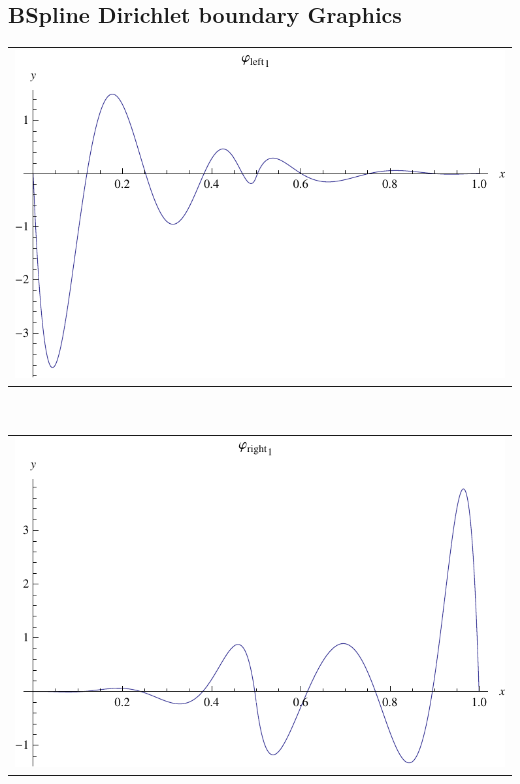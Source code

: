 \documentclass{article}
\begin{document}
\begin{landscape}
\subsection{BSpline Dirichlet boundary Graphics}
\begin{tabular}{c}
\includegraphics[width=20.cm]{septic_bspline_dleft_1.pdf}\end{tabular} 
 \\ 
\begin{tabular}{c}
\includegraphics[width=20.cm]{septic_bspline_dright_1.pdf}\end{tabular} 
 \end{landscape}
\end{document}
